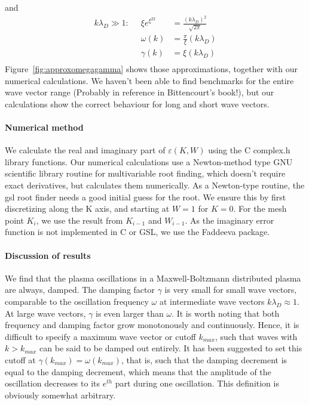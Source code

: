 \documentclass[physics,phd,nolot,nolof]{uccthesis}%
\begin{document}
and
\begin{eqnarray}
k\lambda_D \gg 1:\;\; 
&\xi e^{\xi^22}&=\frac{(k\lambda_D)^2}{\sqrt{2\pi}} \\
& \omega(k)&=\frac{\pi}{\xi}(k\lambda_D)\\
& \gamma(k)&=\xi(k\lambda_D)\\
	\label{eq:approxbigk}
\end{eqnarray}
Figure~\ref{fig:approxomegagamma} shows those approximations, together with our numerical calculations. 
We haven't been able to find benchmarks for the entire wave vector range (Probably in reference in Bittencourt's book!), but our calculations show the correct behaviour for long and short wave vectors. 

\paragraph*{Numerical method}
We calculate the real and imaginary part of $\varepsilon(K,W)$ using the C complex.h library functions. 
Our numerical calculations use a Newton-method type GNU scientific library \cite{gslsite}
routine for multivariable root finding, which doesn't require exact derivatives, but calculates them numerically.
As a Newton-type routine, the gsl root finder needs a good initial guess for the root. 
We ensure this by first discretizing along the K axis, and starting at $W=1$ for $K=0$. 
For the  mesh point $K_i$, we use the result from $K_{i-1}$ and $W_{i-1}$. 
As the imaginary error function is not implemented in C or GSL, we use the Faddeeva package\cite{Faddeevapackage}. 

\paragraph*{Discussion of results}
We find that the plasma oscillations in a Maxwell-Boltzmann distributed plasma are always, damped. 
The damping factor $\gamma$ is very small for small wave vectors, comparable to the oscillation frequency $\omega$ at intermediate wave vectors $k\lambda_D\approx 1$. 
At large wave vectors, $\gamma$ is even larger than $\omega$. 
It is worth noting that both frequency and damping factor grow monotonously and continuously. 
Hence, it is difficult to specify a maximum wave vector or cutoff $k_{max}$, such that 
waves with $k>k_{max}$ can be said to be damped out entirely.
It has been suggested \cite{boydsanderson} to set this cutoff at $\gamma(k_{max})=\omega(k_{max})$, that is, such that the damping decrement is equal to the damping decrement, which means that the amplitude of the oscillation decreases to its $e^{th}$ part during one oscillation.
This definition is obviously somewhat arbitrary.
\end{document}
